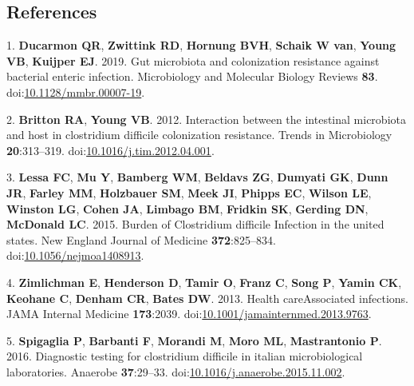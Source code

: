 \documentclass[11pt,]{article}
\newlength{\cslhangindent}
\newenvironment{cslreferences}%
  {\setlength{\parindent}{0pt}%
  \everypar{\setlength{\hangindent}{\cslhangindent}}\ignorespaces}%
  {\par}
\begin{document}
\newpage

\hypertarget{references}{%
\subsection{References}\label{references}}

\hypertarget{refs}{}
\begin{cslreferences}
\leavevmode\hypertarget{ref-ducarmon2019}{}%
1. \textbf{Ducarmon QR}, \textbf{Zwittink RD}, \textbf{Hornung BVH},
\textbf{Schaik W van}, \textbf{Young VB}, \textbf{Kuijper EJ}. 2019. Gut
microbiota and colonization resistance against bacterial enteric
infection. Microbiology and Molecular Biology Reviews \textbf{83}.
doi:\href{https://doi.org/10.1128/mmbr.00007-19}{10.1128/mmbr.00007-19}.

\leavevmode\hypertarget{ref-britton2012}{}%
2. \textbf{Britton RA}, \textbf{Young VB}. 2012. Interaction between the
intestinal microbiota and host in clostridium difficile colonization
resistance. Trends in Microbiology \textbf{20}:313--319.
doi:\href{https://doi.org/10.1016/j.tim.2012.04.001}{10.1016/j.tim.2012.04.001}.

\leavevmode\hypertarget{ref-lessa2015}{}%
3. \textbf{Lessa FC}, \textbf{Mu Y}, \textbf{Bamberg WM},
\textbf{Beldavs ZG}, \textbf{Dumyati GK}, \textbf{Dunn JR},
\textbf{Farley MM}, \textbf{Holzbauer SM}, \textbf{Meek JI},
\textbf{Phipps EC}, \textbf{Wilson LE}, \textbf{Winston LG},
\textbf{Cohen JA}, \textbf{Limbago BM}, \textbf{Fridkin SK},
\textbf{Gerding DN}, \textbf{McDonald LC}. 2015. Burden of Clostridium
difficile Infection in the united states. New England Journal of
Medicine \textbf{372}:825--834.
doi:\href{https://doi.org/10.1056/nejmoa1408913}{10.1056/nejmoa1408913}.

\leavevmode\hypertarget{ref-zimlichman2013}{}%
4. \textbf{Zimlichman E}, \textbf{Henderson D}, \textbf{Tamir O},
\textbf{Franz C}, \textbf{Song P}, \textbf{Yamin CK}, \textbf{Keohane
C}, \textbf{Denham CR}, \textbf{Bates DW}. 2013. Health careAssociated
infections. JAMA Internal Medicine \textbf{173}:2039.
doi:\href{https://doi.org/10.1001/jamainternmed.2013.9763}{10.1001/jamainternmed.2013.9763}.

\leavevmode\hypertarget{ref-spigaglia2016}{}%
5. \textbf{Spigaglia P}, \textbf{Barbanti F}, \textbf{Morandi M},
\textbf{Moro ML}, \textbf{Mastrantonio P}. 2016. Diagnostic testing for
clostridium difficile in italian microbiological laboratories. Anaerobe
\textbf{37}:29--33.
doi:\href{https://doi.org/10.1016/j.anaerobe.2015.11.002}{10.1016/j.anaerobe.2015.11.002}.


\end{cslreferences}
\end{document}
